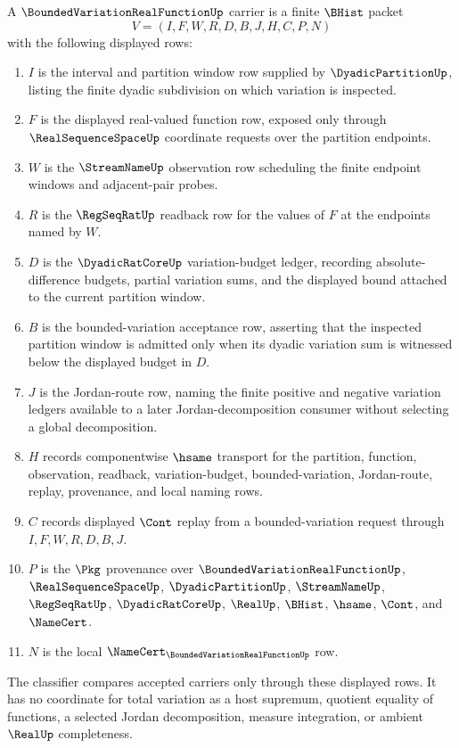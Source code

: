 \begin{definition}
\label{def:bounded-variation-real-function-carrier}
A $\BoundedVariationRealFunctionUp$ carrier is a finite $\BHist$ packet
$$
V=(I,F,W,R,D,B,J,H,C,P,N)
$$
with the following displayed rows:
\begin{enumerate}
\item $I$ is the interval and partition window row supplied by $\DyadicPartitionUp$, listing the finite dyadic subdivision on which variation is inspected.
\item $F$ is the displayed real-valued function row, exposed only through $\RealSequenceSpaceUp$ coordinate requests over the partition endpoints.
\item $W$ is the $\StreamNameUp$ observation row scheduling the finite endpoint windows and adjacent-pair probes.
\item $R$ is the $\RegSeqRatUp$ readback row for the values of $F$ at the endpoints named by $W$.
\item $D$ is the $\DyadicRatCoreUp$ variation-budget ledger, recording absolute-difference budgets, partial variation sums, and the displayed bound attached to the current partition window.
\item $B$ is the bounded-variation acceptance row, asserting that the inspected partition window is admitted only when its dyadic variation sum is witnessed below the displayed budget in $D$.
\item $J$ is the Jordan-route row, naming the finite positive and negative variation ledgers available to a later Jordan-decomposition consumer without selecting a global decomposition.
\item $H$ records componentwise $\hsame$ transport for the partition, function, observation, readback, variation-budget, bounded-variation, Jordan-route, replay, provenance, and local naming rows.
\item $C$ records displayed $\Cont$ replay from a bounded-variation request through $I,F,W,R,D,B,J$.
\item $P$ is the $\Pkg$ provenance over $\BoundedVariationRealFunctionUp$, $\RealSequenceSpaceUp$, $\DyadicPartitionUp$, $\StreamNameUp$, $\RegSeqRatUp$, $\DyadicRatCoreUp$, $\RealUp$, $\BHist$, $\hsame$, $\Cont$, and $\NameCert$.
\item $N$ is the local $\NameCert_{\BoundedVariationRealFunctionUp}$ row.
\end{enumerate}
The classifier compares accepted carriers only through these displayed rows. It has no coordinate for total variation as a host supremum, quotient equality of functions, a selected Jordan decomposition, measure integration, or ambient $\RealUp$ completeness.
\end{definition}

